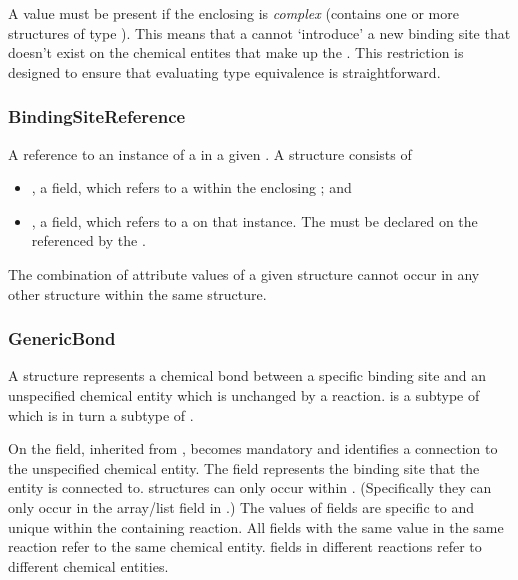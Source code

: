 \documentclass{cekarticle}
\begin{document}
A  value must be present if the
enclosing  is \emph{complex} (contains one or
more structures of type ).  This means
that a  cannot `introduce' a new binding site
that doesn't exist on the chemical entites that make up the
.  This restriction is designed to ensure that
evaluating type equivalence is straightforward.

\subsubsection{BindingSiteReference}

A reference to an instance of a  in a given .
A  structure consists of

\begin{itemize}

\item {}, a  field,
which refers to a  within the enclosing
; and

\item {}, a  field, which refers to a
 on that instance.  The 
must be declared on the  referenced by the
.

\end{itemize}

The combination of attribute values of a given  structure cannot
occur in any other  structure within the same 
structure.

\subsubsection{GenericBond}

A  structure represents a chemical bond between
a specific binding site and an unspecified chemical entity which
is unchanged by a reaction.  is a subtype of
 which is in turn a subtype of .

On  the  field, inherited from
, becomes mandatory and identifies a connection to
the unspecified chemical entity. The 
field represents the binding site that the entity is connected to.
 structures can only occur within
. (Specifically they can only occur in the
 array/list field in .)
The values of   fields are specific
to and unique within the containing reaction. All
  fields with the same value in the
same reaction refer to the same chemical entity.
  fields in different reactions
refer to different chemical entities.
\end{document}
